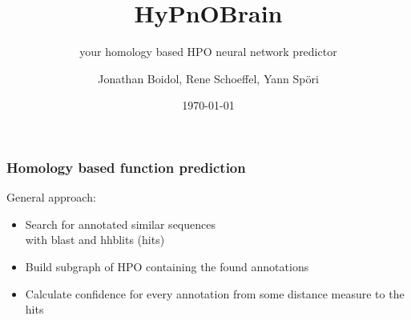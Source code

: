 \documentclass{beamer}
\author{Jonathan Boidol, Rene Schoeffel, Yann Sp\"ori}
\title{HyPnOBrain}
\subtitle{your homology based HPO neural network predictor}
\date{\today}
\begin{document}
\begin{frame}
\maketitle
 
\end{frame}

\begin{frame}
  \frametitle{Homology based function prediction}
  General approach:
  \begin{itemize}
  	\item Search for annotated similar sequences\\with blast and hhblits (hits)
  	\item Build subgraph of HPO containing the found annotations
  	\item Calculate confidence for every annotation from some distance measure to the hits
  \end{itemize}

\end{frame}
\end{document}
